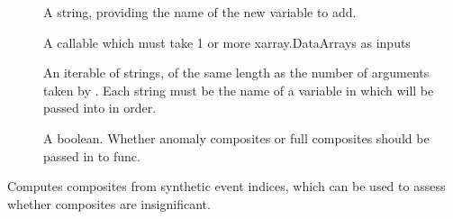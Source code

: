 \documentclass[letterpaper,10pt,english]{sphinxmanual}
\begin{document}
\begin{fulllineitems}
\begin{fulllineitems}
\sphinxAtStartPar
{}
\begin{description}
\item[{}] \leavevmode
\sphinxAtStartPar
A string, providing the name of the new variable to add.

\item[{}] \leavevmode
\sphinxAtStartPar
A callable which must take 1 or more xarray.DataArrays as inputs

\item[{}] \leavevmode
\sphinxAtStartPar
An iterable of strings, of the same length as the number of arguments taken by . Each string must be the name of a variable in  which will be passed into  in order.

\end{description}

\sphinxAtStartPar
{}
\begin{description}
\item[{}] \leavevmode
\sphinxAtStartPar
A boolean. Whether anomaly composites or full composites should be passed in to func.

\end{description}

\end{fulllineitems}


\begin{fulllineitems}
\label{\detokenize{docs/composites:composites.LaggedAnalyser.compute_bootstraps}}
\pysigstartsignatures
{}
\pysigstopsignatures
\sphinxAtStartPar
Computes composites from synthetic event indices, which can be used to assess whether composites are insignificant.


\end{fulllineitems}
\end{fulllineitems}
\end{document}
